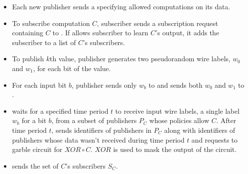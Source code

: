 \begin{figure*}[t]
\begin{mdframed}[style=myframe]

\initialize
\begin{itemize}[leftmargin=*,itemsep=2pt,topsep=2pt]
 
	\item Each new publisher sends \broker a \policy specifying allowed
		computations on its data.

\end{itemize}

\subscribe
\begin{itemize}[leftmargin=*,itemsep=2pt,topsep=2pt]

	\item To subscribe computation $C$, subscriber sends a subscription request
		containing $C$ to \broker. If \broker allows subscriber to learn $C$'s
		output, it adds the subscriber to a list of $C$'s subscribers. 

\end{itemize}

\publish
\begin{itemize}[leftmargin=*,itemsep=2pt,topsep=2pt,after=]
		
	\item To publish $k$th value, publisher generates two pseudorandom wire
		labels, $w_0$ and $w_1$, for each bit of the value. 
		
	\item For each input bit $b$, publisher sends only $w_b$ to \broker and sends
		both $w_0$ and $w_1$ to \garbler.

\end{itemize}

\process
\begin{itemize}[leftmargin=*,itemsep=2pt,topsep=2pt]

	\item \broker waits for a specified time period $t$ to receive input wire
		labels, a single label $w_b$ for a bit $b$, from a subset of publishers
		$P_C$ whose policies allow $C$. After time period $t$, \broker sends
		\garbler identifiers of publishers in $P_C$ along with identifiers of
		publishers whose data wasn't received during time period $t$ and requests
		\garbler to garble circuit for $XOR \circ C$. $XOR$ is used to mask the
		output of the circuit.

	\item \broker sends \garbler the set of $C$'s subscribers $S_C$.
		

\end{itemize}
\end{mdframed}
\end{figure*}
